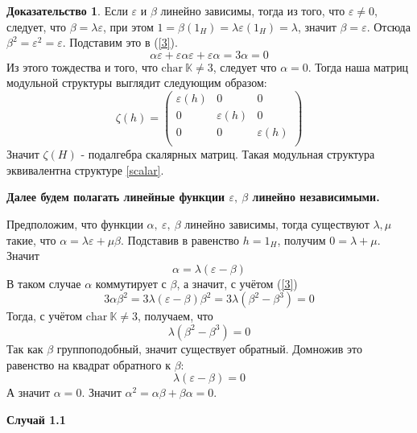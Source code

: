 \documentclass[a4paper, 12pt]{article}
\theoremstyle{definition}
\newtheorem*{prof}{\hspace*{\parindent}Доказательство}
\begin{document}
\begin{prof}
    Если $\varepsilon$ и $\beta$ линейно зависимы, тогда из того, что $\varepsilon \neq 0$, следует, что $\beta = \lambda\varepsilon$, при этом $1 = \beta(1_H)=\lambda\varepsilon(1_H)=\lambda$, значит $\beta = \varepsilon$.
    Отсюда $\beta^2 = \varepsilon^2 = \varepsilon$. Подставим это в (\ref{3}).
    \[
        \alpha\varepsilon + \varepsilon\alpha \varepsilon + \varepsilon \alpha = 3\alpha = 0
    \]
    Из этого тождества и того, что $\mathrm{char} \ \mathbb{K} \neq 3$, следует что $\alpha = 0$. Тогда наша матриц модульной структуры выглядит следующим образом:\[
    \zeta(h) = \begin{pmatrix}
        \varepsilon(h) & 0 & 0\\
        0 & \varepsilon(h) & 0\\
        0 & 0 & \varepsilon(h)\\
    \end{pmatrix}
    \]
    Значит $\zeta(H)$ - подалгебра скалярных матриц. Такая модульная структура эквивалентна структуре \ref{scalar}.
    
    \textbf{Далее будем полагать линейные функции $\varepsilon,\ \beta$ линейно независимыми.}

    Предположим, что функции $\alpha,\ \varepsilon,\ \beta$ линейно зависимы, тогда существуют $\lambda, \mu$ такие, что $\alpha = \lambda \varepsilon + \mu \beta$. 
    Подставив в равенство $h = 1_H$, получим $0 = \lambda + \mu$.
    Значит \[\alpha = \lambda(\varepsilon - \beta)\]
    В таком случае $\alpha$ коммутирует с $\beta$, а значит, с учётом (\ref{3})
    \[
        3\alpha\beta^2 = 3\lambda(\varepsilon-\beta)\beta^2 = 3\lambda(\beta^2-\beta^3)=0
    \]
    Тогда, с учётом $\mathrm{char} \ \mathbb{K} \neq 3$, получаем, что
    \[
        \lambda(\beta^2-\beta^3) = 0
    \]
    Так как $\beta$ группоподобный, значит существует обратный. Домножив это равенство на квадрат обратного к $\beta$:
    \[
        \lambda(\varepsilon-\beta) = 0
    \]
    А значит $\alpha = 0$. Значит $\alpha^2 = \alpha\beta+\beta\alpha = 0$. 
    
    \textbf{Случай 1.1}
    

\end{prof}
\end{document}
